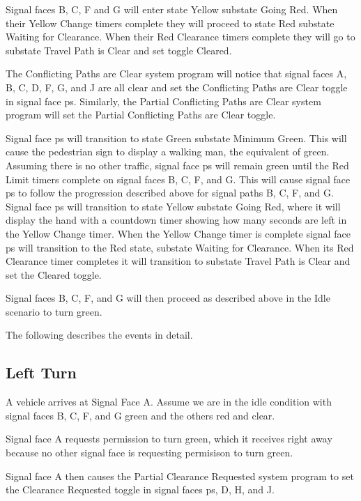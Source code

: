 \documentclass[letterpaper,twoside]{article}
\begin{document}
Signal faces B, C, F and G will enter state Yellow substate Going Red.
When their Yellow Change timers complete they will proceed to state Red
substate Waiting for Clearance.
When their Red Clearance timers complete they will go
to substate Travel Path is Clear and set toggle Cleared.

The Conflicting Paths are Clear system program will notice that
signal faces A, B, C, D, F, G, and J are all clear and set the
Conflicting Paths are Clear toggle in signal face ps.  Similarly,
the Partial Conflicting Paths are Clear system program will set the
Partial Conflicting Paths are Clear toggle.

Signal face ps will transition to state Green substate Minimum Green.
This will cause the pedestrian sign to display a walking man, the equivalent
of green.  Assuming there is no other traffic, signal face ps will remain green
until the Red Limit timers complete on signal faces B, C, F, and G.
This will cause signal face ps to follow the progression described above
for signal paths B, C, F, and G.  Signal face ps  will transition to state
Yellow
substate Going Red, where it will display the hand with a countdown timer
showing how many seconds are left in the Yellow Change timer.  When the Yellow
Change timer is complete signal face ps will transition to the Red state,
substate Waiting for Clearance.  When its Red Clearance timer completes it will
transition to substate Travel Path is Clear and set the Cleared toggle.

Signal faces B, C, F, and G will then proceed as described above
in the Idle scenario to turn green.

The following describes the events in detail.



\subsection{Left Turn}

A vehicle arrives at Signal Face A.  Assume we are in the idle condition
with signal faces B, C, F, and G green and the others red and clear.

Signal face A requests permission to turn green, which it receives right
away because no other signal face is requesting permisison to turn green.

Signal face A then causes the Partial Clearance Requested system program
to set the Clearance Requested toggle in signal faces ps, D, H, and J.
\end{document}
